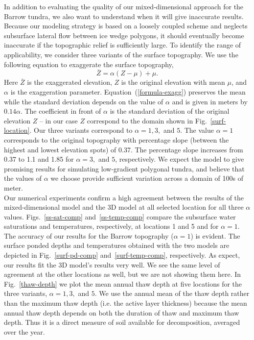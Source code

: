 \documentclass[review,11pt]{elsarticle}
\begin{document}
In addition to evaluating the quality of our mixed-dimensional approach for the Barrow tundra, we also want to understand when it will give inaccurate results. Because our modeling strategy is based on a loosely coupled scheme and neglects subsurface lateral flow between ice wedge polygons, it should eventually become inaccurate if the topographic relief is sufficiently large. To identify the range of applicability, we consider three variants of the surface topography.  We use the following equation to exaggerate the surface topography,
\begin{equation}\label{formula-exagg}
\bar{Z} =  \alpha (Z - \mu) + \mu.
\end{equation}
Here $\bar{Z}$ is the exaggerated elevation, $Z$ is the original elevation with mean $\mu$, and $\alpha$ is the exaggeration parameter. Equation~(\ref{formula-exagg})  preserves the mean while the standard deviation depends on the value of $\alpha$ and is given in meters by $0.14 \alpha$. The coefficient in front of $\alpha$ is the standard deviation of the original elevation $Z$ -- in our case $Z$ correspond to the domain shown in Fig.~\ref{surf-location}. Our three variants correspond to $\alpha=1,3,$ and $5$. The value $\alpha=1$ corresponds to the original topography with percentage slope (between the highest and lowest elevation spots) of 0.37. The percentage slope increases from 0.37 to 1.1 and 1.85 for $\alpha =3,$ and $5$, respectively. We expect the model to give promising results for simulating low-gradient polygonal tundra, and believe that the values of $\alpha$ we choose provide sufficient variation across a domain of 100s of meter.  \\
Our numerical experiments confirm a high agreement between the results of the mixed-dimensional model and the 3D model at all selected location for all three $\alpha$ values. Figs.~\ref{ss-sat-comp} and~\ref{ss-temp-comp} compare the subsurface water saturations and temperatures, respectively, at locations 1 and 5 and for $\alpha=1$. The accuracy of our results for the Barrow topography ($\alpha=1$) is evident. The surface ponded depths and temperatures obtained with the two models are depicted in Fig.~\ref{surf-pd-comp} and~\ref{surf-temp-comp}, respectively. As expect, our results fit the 3D model's results very well. We see the same level of agreement at the other locations as well, but we are not showing them here.
In Fig.~\ref{thaw-depth} we plot the mean annual thaw depth at five locations for the three variants, $\alpha =1, 3,$ and $5$. We use the annual mean of the thaw depth rather than the maximum thaw depth (i.e. the active layer thickness) because the mean annual thaw depth depends on both the duration of thaw and maximum thaw depth. Thus it is a direct measure of soil available for decomposition, averaged over the year. 
\end{document}
